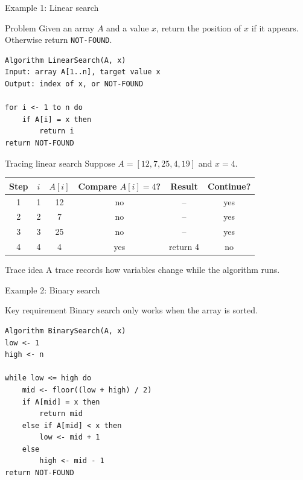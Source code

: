 \documentclass[aspectratio=43,10pt]{beamer}
\begin{document}
\begin{frame}[fragile]{Example 1: Linear search}
\begin{block}{Problem}
Given an array $A$ and a value $x$, return the position of $x$ if it appears. Otherwise return \texttt{NOT-FOUND}.
\end{block}

\begin{lstlisting}[style=pseudo]
Algorithm LinearSearch(A, x)
Input: array A[1..n], target value x
Output: index of x, or NOT-FOUND

for i <- 1 to n do
    if A[i] = x then
        return i
return NOT-FOUND
\end{lstlisting}
\end{frame}

\begin{frame}{Tracing linear search}
  Suppose $A = [12, 7, 25, 4, 19]$ and $x = 4$.

  \vspace{0.6em}
  \begin{center}
  \begin{tabular}{cccccc}
    \toprule
    Step & $i$ & $A[i]$ & Compare $A[i]=4$? & Result & Continue? \\
    \midrule
    1 & 1 & 12 & no & -- & yes \\
    2 & 2 & 7  & no & -- & yes \\
    3 & 3 & 25 & no & -- & yes \\
    4 & 4 & 4  & yes & return 4 & no \\
    \bottomrule
  \end{tabular}
  \end{center}

  \vspace{0.8em}
  \begin{block}{Trace idea}
  A trace records how variables change while the algorithm runs.
  \end{block}
\end{frame}

\begin{frame}[fragile]{Example 2: Binary search}
\begin{block}{Key requirement}
Binary search only works when the array is sorted.
\end{block}

\begin{lstlisting}[style=pseudo,basicstyle=\ttfamily\scriptsize]
Algorithm BinarySearch(A, x)
low <- 1
high <- n

while low <= high do
    mid <- floor((low + high) / 2)
    if A[mid] = x then
        return mid
    else if A[mid] < x then
        low <- mid + 1
    else
        high <- mid - 1
return NOT-FOUND
\end{lstlisting}
\end{frame}
\end{document}
